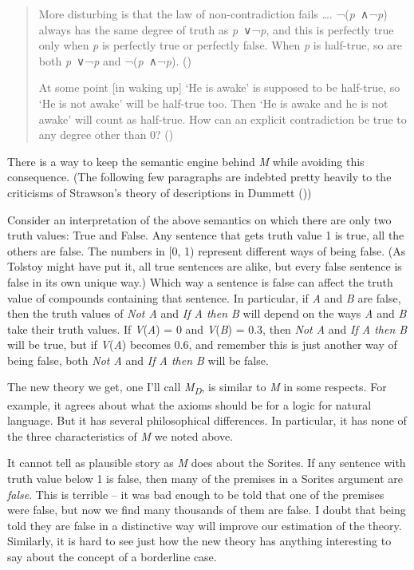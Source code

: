\documentclass[
  10pt,
  letterpaper,
  DIV=11,
  numbers=noendperiod,
  twoside]{scrartcl}
\begin{document}
\begin{quote}
More disturbing is that the law of non-contradiction fails \ldots.
¬(\emph{p}~∧¬\emph{p}) always has the same degree of truth as
\emph{p}~∨¬\emph{p}, and this is perfectly true only when \emph{p} is
perfectly true or perfectly false. When \emph{p} is half-true, so are
both \emph{p}~∨¬\emph{p} and ¬(\emph{p}~∧¬\emph{p}).
()

At some point {[}in waking up{]} `He is awake' is supposed to be
half-true, so `He is not awake' will be half-true too. Then `He is awake
and he is not awake' will count as half-true. How can an explicit
contradiction be true to any degree other than 0?
()
\end{quote}

There is a way to keep the semantic engine behind \emph{M} while
avoiding this consequence. (The following few paragraphs are indebted
pretty heavily to the criticisms of Strawson's theory of descriptions in
Dummett ())

Consider an interpretation of the above semantics on which there are
only two truth values: True and False. Any sentence that gets truth
value 1 is true, all the others are false. The numbers in {[}0, 1)
represent different ways of being false. (As Tolstoy might have put it,
all true sentences are alike, but every false sentence is false in its
own unique way.) Which way a sentence is false can affect the truth
value of compounds containing that sentence. In particular, if \emph{A}
and \emph{B} are false, then the truth values of \emph{Not A} and
\emph{If A then B} will depend on the ways \emph{A} and \emph{B} take
their truth values. If \emph{V}(\emph{A}) = 0 and \emph{V}(\emph{B}) =
0.3, then \emph{Not A} and \emph{If A then B} will be true, but if
\emph{V}(\emph{A}) becomes 0.6, and remember this is just another way of
being false, both \emph{Not A} and \emph{If A then B} will be false.

The new theory we get, one I'll call \emph{M\textsubscript{D}}, is
similar to \emph{M} in some respects. For example, it agrees about what
the axioms should be for a logic for natural language. But it has
several philosophical differences. In particular, it has none of the
three characteristics of \emph{M} we noted above.

It cannot tell as plausible story as \emph{M} does about the Sorites. If
any sentence with truth value below 1 is false, then many of the
premises in a Sorites argument are \emph{false}. This is terrible -- it
was bad enough to be told that one of the premises were false, but now
we find many thousands of them are false. I doubt that being told they
are false in a distinctive way will improve our estimation of the
theory. Similarly, it is hard to see just how the new theory has
anything interesting to say about the concept of a borderline case.
\end{document}
